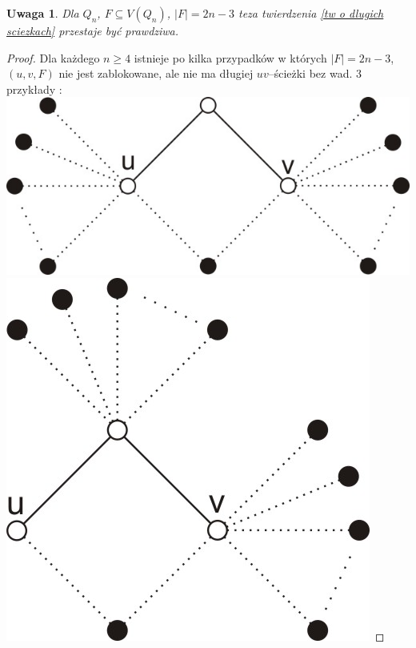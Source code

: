 \documentclass{pracamgr}
\newtheorem{remark}[theorem]{Uwaga}
\begin{document}
    \begin{remark}\label{dluga sciezka 2n-3 za duzo}
     Dla $Q_n$, $F\subseteq V(Q_n)$, $|F|=2n-3$ teza twierdzenia \ref{tw o dlugich sciezkach} przestaje być prawdziwa.
    \end{remark}
    \begin{proof}
    Dla każdego $n\ge 4$ istnieje po kilka przypadków w których $|F|=2n-3$, $(u,v,F)$ nie jest zablokowane, ale nie ma długiej $uv$--ścieżki bez wad.
    3 przykłady :\newline
    \includegraphics{img/Q_niezablokowane_1.jpg}\quad\quad\quad
    \includegraphics{img/Q_niezablokowane_2.jpg}\quad\quad\quad

\end{proof}
\end{document}
